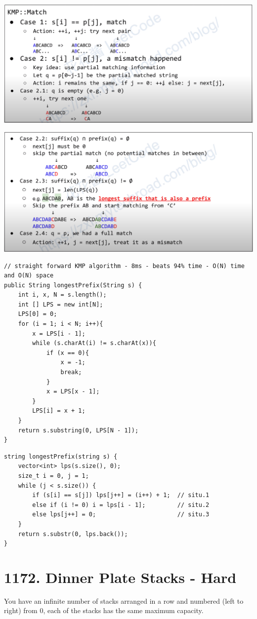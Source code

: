 \documentclass[9pt, b5paaper]{book}
\begin{document}
\includegraphics[width=.9\linewidth]{./pic/kmp3.png}

\includegraphics[width=.9\linewidth]{./pic/kmp4.png}

\begin{verbatim}
// straight forward KMP algorithm - 8ms - beats 94% time - O(N) time and O(N) space
public String longestPrefix(String s) {
    int i, x, N = s.length();
    int [] LPS = new int[N];
    LPS[0] = 0;
    for (i = 1; i < N; i++){
        x = LPS[i - 1];
        while (s.charAt(i) != s.charAt(x)){
            if (x == 0){
                x = -1;
                break;
            }
            x = LPS[x - 1];
        }
        LPS[i] = x + 1;
    }
    return s.substring(0, LPS[N - 1]);
}
\end{verbatim}
\begin{verbatim}
string longestPrefix(string s) {
    vector<int> lps(s.size(), 0);
    size_t i = 0, j = 1;
    while (j < s.size()) {
        if (s[i] == s[j]) lps[j++] = (i++) + 1;  // situ.1
        else if (i != 0) i = lps[i - 1];         // situ.2
        else lps[j++] = 0;                       // situ.3
    }
    return s.substr(0, lps.back());
}
\end{verbatim}
\section{1172. Dinner Plate Stacks - Hard}
\label{sec-3-4}
You have an infinite number of stacks arranged in a row and numbered (left to right) from 0, each of the stacks has the same maximum capacity.
\end{document}
